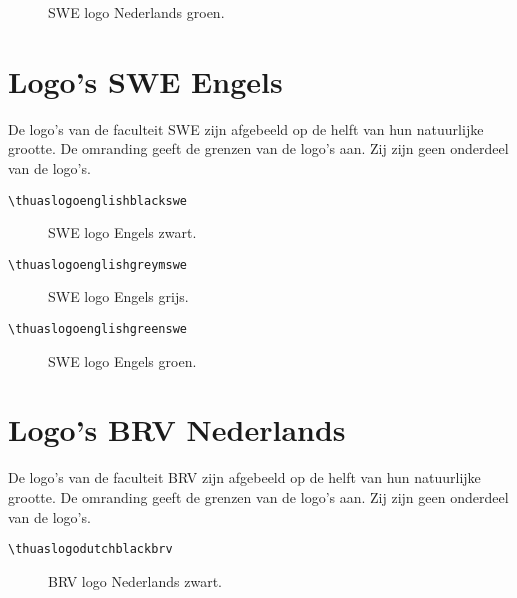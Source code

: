 \documentclass[a4paper,12pt]{article}
\begin{document}
\begin{figure}[H]
\centering\fboxsep=0pt%
\fbox{%
\scalebox{0.7071}{\thuaslogodutchgreenswe}}
\caption{SWE logo Nederlands groen.}
\end{figure}


\section{Logo's SWE Engels}
De logo's van de faculteit SWE zijn afgebeeld op de helft van hun natuurlijke grootte.
De omranding geeft de grenzen van de logo's aan. Zij zijn geen onderdeel
van de logo's.

\begin{verbatim}
\thuaslogoenglishblackswe
\end{verbatim}

\begin{figure}[H]
\centering\fboxsep=0pt%
\fbox{%
\scalebox{0.7071}{\thuaslogoenglishblackswe}}
\caption{SWE logo Engels zwart.}
\end{figure}

\begin{verbatim}
\thuaslogoenglishgreymswe
\end{verbatim}

\begin{figure}[H]
\centering\fboxsep=0pt%
\fbox{%
\scalebox{0.7071}{\thuaslogoenglishgreyswe}}
\caption{SWE logo Engels grijs.}
\end{figure}

\begin{verbatim}
\thuaslogoenglishgreenswe
\end{verbatim}

\begin{figure}[H]
\centering\fboxsep=0pt%
\fbox{%
\scalebox{0.7071}{\thuaslogoenglishgreenswe}}
\caption{SWE logo Engels groen.}
\end{figure}


\section{Logo's BRV Nederlands}
De logo's van de faculteit BRV zijn afgebeeld op de helft van hun natuurlijke grootte.
De omranding geeft de grenzen van de logo's aan. Zij zijn geen onderdeel
van de logo's.

\begin{verbatim}
\thuaslogodutchblackbrv
\end{verbatim}

\begin{figure}[H]
\centering\fboxsep=0pt%
\fbox{%
\scalebox{0.7071}{\thuaslogodutchblackbrv}}
\caption{BRV logo Nederlands zwart.}
\end{figure}
\end{document}
